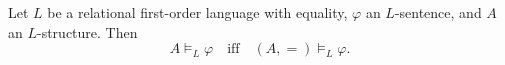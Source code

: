 Let $L$ be a relational first-order language with equality, $\varphi$ an $L$-sentence, and $A$ an $L$-structure. Then
$$A \models_{L} \varphi \quad \text{iff} \quad (A, =) \models_{L} \varphi.$$
